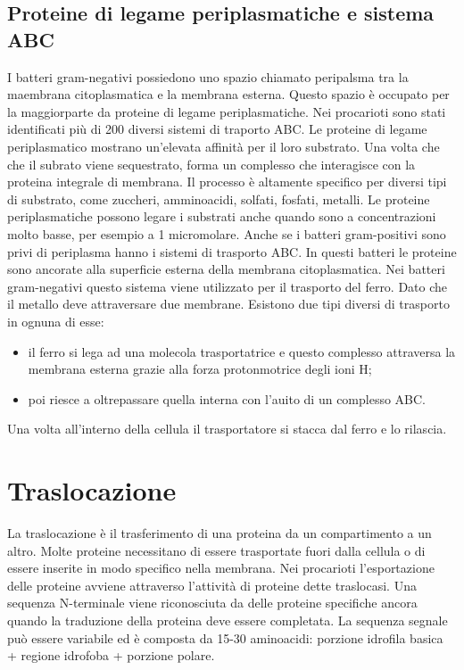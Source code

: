 \subsection{Proteine di legame periplasmatiche e sistema ABC}
I batteri gram-negativi possiedono uno spazio chiamato peripalsma tra la maembrana citoplasmatica e la membrana esterna. Questo spazio \`e occupato per la maggiorparte da proteine di legame periplasmatiche. 
Nei procarioti sono stati identificati pi\`u di 200 diversi sistemi di traporto ABC. Le proteine di legame periplasmatico mostrano un'elevata affinit\`a per il loro substrato. Una volta che che il subrato viene sequestrato, forma un complesso che interagisce con la proteina integrale di membrana. Il processo \`e altamente specifico per diversi tipi di substrato, come zuccheri, amminoacidi, solfati, fosfati, metalli. Le proteine periplasmatiche possono legare i substrati anche quando sono a concentrazioni molto basse, per esempio a 1 micromolare.
Anche se i batteri gram-positivi sono privi di periplasma hanno i sistemi di trasporto ABC. In questi batteri le proteine sono ancorate alla superficie esterna della membrana citoplasmatica. 
Nei batteri gram-negativi questo sistema viene utilizzato per il trasporto del ferro. Dato che il metallo deve attraversare due membrane. Esistono due tipi diversi di trasporto in ognuna di esse: 
\begin{itemize}
    \item il ferro si lega ad una molecola trasportatrice e questo complesso attraversa la membrana esterna grazie alla forza protonmotrice degli ioni H\ap{+};
    \item poi riesce a oltrepassare quella interna con l'auito di un complesso ABC. 
\end{itemize}
Una volta all'interno della cellula il trasportatore si stacca dal ferro e lo rilascia. 
\section{Traslocazione}
La traslocazione \`e il trasferimento di una proteina da un compartimento a un altro. Molte proteine necessitano di essere trasportate fuori dalla cellula o di essere inserite in modo specifico nella membrana. Nei procarioti l'esportazione delle proteine avviene attraverso l'attivit\`a di proteine dette traslocasi. Una sequenza N-terminale viene  riconosciuta da delle proteine specifiche ancora quando la traduzione della proteina deve essere completata. La sequenza segnale pu\`o essere variabile ed \`e composta da 15-30 aminoacidi: porzione idrofila basica + regione idrofoba + porzione polare.
